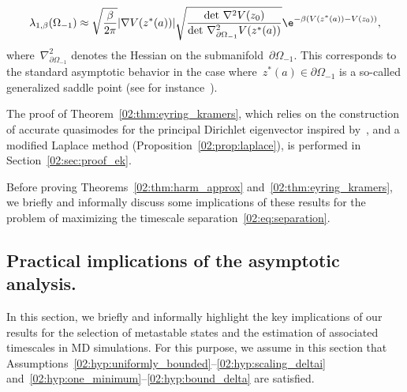 \begin{remark}
    \[\lambda_{1,\beta}(\Omega_{-1})\approx \sqrt{\frac{\beta}{2\pi}}|\nabla  V(z^*(a))|\sqrt{\frac{\det\,\nabla^2 V(z_0)}{\det\,\nabla^2_{\partial \Omega_{-1}}V(z^*(a))}}\e^{-\beta (V(z^*(a))-V(z_0))},\]
    where~$\nabla^2_{\partial \Omega_{-1}}$ denotes the Hessian on the submanifold~$\partial \Omega_{-1}$. This corresponds to the standard asymptotic behavior in the case where~$z^*(a)\in \partial \Omega_{-1}$ is a so-called generalized saddle point (see for instance~\cite{HN06,LPN21}).
    \end{remark}


    The proof of Theorem~\ref{02:thm:eyring_kramers}, which relies on the construction of accurate quasimodes for the principal Dirichlet eigenvector inspired by~\cite{LPN21}, and a modified Laplace method (Proposition~\ref{02:prop:laplace}), is performed in Section~\ref{02:sec:proof_ek}.

    Before proving Theorems~\ref{02:thm:harm_approx} and~\ref{02:thm:eyring_kramers}, we briefly and informally discuss some implications of these results for the problem of maximizing the timescale separation~\eqref{02:eq:separation}.
    \subsection{Practical implications of the asymptotic analysis.}
    \label{02:subsec:takeaways}
    In this section, we briefly and informally highlight the key implications of our results for the selection of metastable states and the estimation of associated timescales in MD simulations. For this purpose, we assume in this section that Assumptions~\eqref{02:hyp:uniformly_bounded}--\eqref{02:hyp:scaling_deltai} and~\eqref{02:hyp:one_minimum}--\eqref{02:hyp:bound_delta} are satisfied.
    
